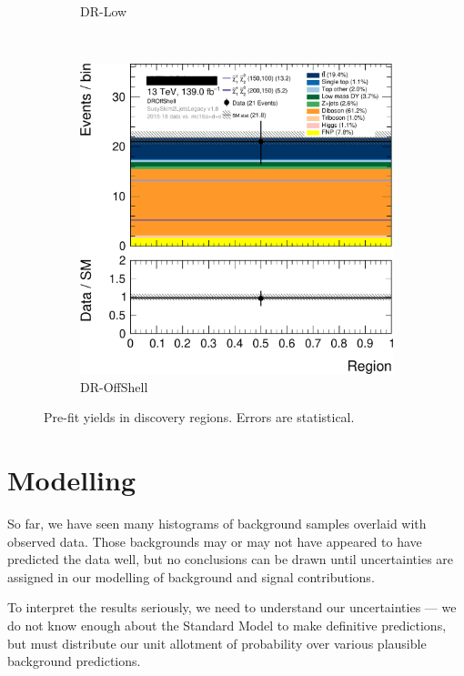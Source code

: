 \begin{figure}[tp]
\begin{subfigure}{0.38\textwidth}
\caption{DR-Low}
\end{subfigure}
\\[0.5em]
\begin{subfigure}{0.38\textwidth}
\centering
\includegraphics[width=\textwidth]{figures/2ljets_disco_plot_DROffShell.png}
\caption{DR-OffShell}
\end{subfigure}
\caption[
Pre-fit yields in discovery regions
]{%
Pre-fit yields in discovery regions.
Errors are statistical.
}
\label{fig:2ljets_disco_prefit}
\end{figure}


\FloatBarrier
\section{Modelling}
\label{sec:2ljets_modelling}
So far, we have seen many histograms of background samples overlaid with
observed data.
Those backgrounds may or may not have appeared to have predicted the data well,
but no conclusions can be drawn until uncertainties are assigned in our
modelling of background and signal contributions.

To interpret the results seriously, we need to understand our uncertainties ---
we do not know enough about the Standard Model to make definitive predictions,
but must distribute our unit allotment of probability over various plausible
background predictions.

